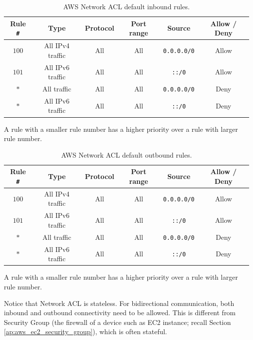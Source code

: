 \begin{table}[!htb]
	\centering
	\caption{AWS Network ACL default inbound rules.} \label{tab:aws_networkacl_inbound}
	\begin{tabular}{cccccc}
		\hline
        Rule \verb|#| & Type & Protocol & Port range & Source & Allow / Deny \\ \hline
        $100$ & All IPv4 traffic & All & All & \texttt{0.0.0.0/0} & Allow \\
        $101$ & All IPv6 traffic & All & All & \texttt{::/0} & Allow \\
        $*$ & All traffic & All & All & \texttt{0.0.0.0/0} & Deny \\
        $*$ & All IPv6 traffic & All & All & \texttt{::/0} & Deny \\
		\hline
	\end{tabular}
	\begin{flushleft}
		\footnotesize
		A rule with a smaller rule number has a higher priority over a rule with larger rule number.
	\end{flushleft}
\end{table}

\begin{table}[!htb]
	\centering
	\caption{AWS Network ACL default outbound rules.} \label{tab:aws_networkacl_outbound}
	\begin{tabular}{cccccc}
		\hline
        Rule \verb|#| & Type & Protocol & Port range & Source & Allow / Deny \\ \hline
        $100$ & All IPv4 traffic & All & All & \texttt{0.0.0.0/0} & Allow \\
        $101$ & All IPv6 traffic & All & All & \texttt{::/0} & Allow \\
        $*$ & All traffic & All & All & \texttt{0.0.0.0/0} & Deny \\
        $*$ & All IPv6 traffic & All & All & \texttt{::/0} & Deny \\
		\hline
	\end{tabular}
	\begin{flushleft}
		\footnotesize
		A rule with a smaller rule number has a higher priority over a rule with larger rule number.
	\end{flushleft}
\end{table}

Notice that Network ACL is stateless. For bidirectional communication, both inbound and outbound connectivity need to be allowed. This is different from Security Group (the firewall of a device such as EC2 instance; recall Section \ref{ap:aws_ec2_security_group}), which is often stateful.

